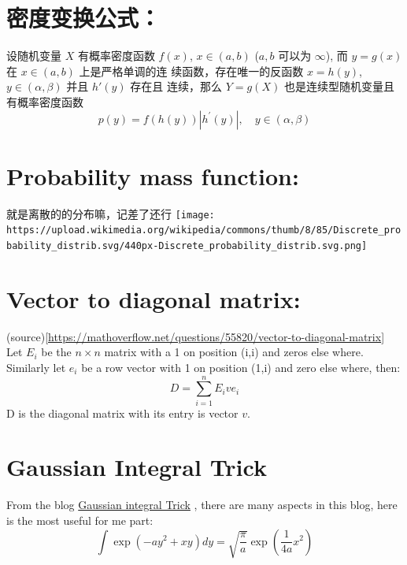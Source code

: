 \documentclass[
]{book}
\theoremstyle{definition}
\theoremstyle{definition}
\theoremstyle{definition}
\theoremstyle{remark}
\begin{document}
\hypertarget{ux5bc6ux5ea6ux53d8ux6362ux516cux5f0f}{%
\section{密度变换公式：}\label{ux5bc6ux5ea6ux53d8ux6362ux516cux5f0f}}

设随机变量 \(X\) 有概率密度函数 \(f(x)\), \(x\in(a, b)\) (\(a, b\) 可以为 \(\infty\)), 而 \(y = g(x)\) 在 \(x \in (a, b)\) 上是严格单调的连
续函数，存在唯一的反函数 \(x = h(y)\), \(y \in (\alpha, \beta)\) 并且 \(h′(y)\) 存在且
连续，那么 \(Y = g(X)\) 也是连续型随机变量且有概率密度函数
\[
p(y)=f(h(y))\left|h^{\prime}(y)\right|, \quad y \in(\alpha, \beta)
\]

\hypertarget{probability-mass-function}{%
\section{Probability mass function:}\label{probability-mass-function}}

就是离散的的分布嘛，记差了还行
\texttt{[image: https://upload.wikimedia.org/wikipedia/commons/thumb/8/85/Discrete\_probability\_distrib.svg/440px-Discrete\_probability\_distrib.svg.png]}

\hypertarget{vector-to-diagonal-matrix}{%
\section{Vector to diagonal matrix:}\label{vector-to-diagonal-matrix}}

(source){[}\url{https://mathoverflow.net/questions/55820/vector-to-diagonal-matrix}{]}
Let \(E_i\) be the \(n\times n\) matrix with a 1 on position (i,i) and zeros else where.
Similarly let \(e_i\) be a row vector with 1 on position (1,i) and zero else where, then:
\[
D=\sum_{i=1}^{n} E_{i} v e_{i}
\]
D is the diagonal matrix with its entry is vector \(v\).

\hypertarget{gaussian-integral-trick}{%
\section{Gaussian Integral Trick}\label{gaussian-integral-trick}}

From the blog \href{http://blog.shakirm.com/2015/08/machine-learning-trick-of-the-day-2-gaussian-integral-trick/}{Gaussian integral Trick} , there are many aspects in this blog, here is the most useful for me part:
\[
\int \exp \left(-a y^{2}+x y\right) d y=\sqrt{\frac{\pi}{a}} \exp \left(\frac{1}{4 a} x^{2}\right)
\]
\end{document}
